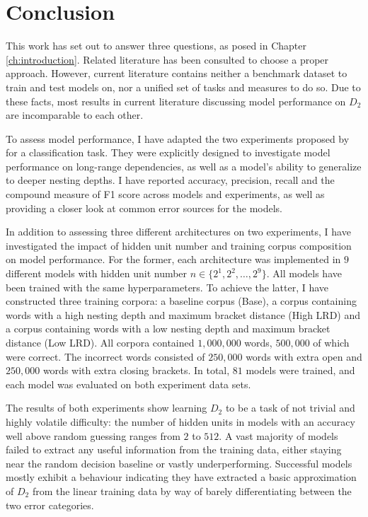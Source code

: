\section{Conclusion}\label{ch:conclusion}
This work has set out to answer three questions, as posed in Chapter \ref{ch:introduction}. Related literature has been consulted to choose a proper approach. However, current literature contains neither a benchmark dataset to train and test models on, nor a unified set of tasks and measures to do so. Due to these facts, most results in current literature discussing model performance on $D_{2}$ are incomparable to each other.

To assess model performance, I have adapted the two experiments proposed by \cite{Bernardy2018} for a classification task. They were explicitly designed to investigate model performance on long-range dependencies, as well as a model's ability to generalize to deeper nesting depths. I have reported accuracy, precision, recall and the compound measure of F1 score across models and experiments, as well as providing a closer look at common error sources for the models.

In addition to assessing three different architectures on two experiments, I have investigated the impact of hidden unit number and training corpus composition on model performance. For the former, each architecture was implemented in $9$ different models with hidden unit number $n \in \lbrace 2^{1}, 2^{2}, \dots, 2^{9} \rbrace$. All models have been trained with the same hyperparameters. To achieve the latter, I have constructed three training corpora: a baseline corpus (Base), a corpus containing words with a high nesting depth and maximum bracket distance (High LRD) and a corpus containing words with a low nesting depth and maximum bracket distance (Low LRD). All corpora contained $1{,}000{,}000$ words, $500{,}000$ of which were correct. The incorrect words consisted of $250{,}000$ words with extra open and $250{,}000$ words with extra closing brackets. In total, $81$ models were trained, and each model was evaluated on both experiment data sets.

The results of both experiments show learning $D_{2}$ to be a task of not trivial and highly volatile difficulty: the number of hidden units in models with an accuracy well above random guessing ranges from $2$ to $512$. A vast majority of models failed to extract any useful information from the training data, either staying near the random decision baseline or vastly underperforming. Successful models mostly exhibit a behaviour indicating they have extracted a basic approximation of $D_{2}$ from the linear training data by way of barely differentiating between the two error categories.

